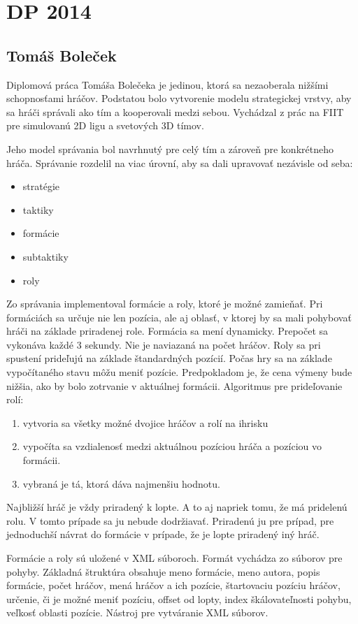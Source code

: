 \section{DP 2014}

\subsection{Tomáš Boleček}
Diplomová práca Tomáša Bolečeka \cite{bolecek} je jedinou, ktorá sa nezaoberala nižšími schopnosťami hráčov. Podstatou bolo vytvorenie modelu strategickej vrstvy, aby sa hráči správali ako tím a kooperovali medzi sebou. Vychádzal z prác na FIIT pre simulovanú 2D ligu a svetových 3D tímov. 

Jeho model správania bol navrhnutý pre celý tím a zároveň pre konkrétneho hráča. Správanie rozdelil na viac úrovní, aby sa dali upravovať nezávisle od seba:
\begin{itemize}
\item stratégie
\item taktiky
\item formácie
\item subtaktiky
\item roly
\end{itemize}
Zo správania implementoval formácie a roly, ktoré je možné zamieňať. Pri formáciách sa určuje nie len pozícia, ale aj oblasť, v ktorej by sa mali pohybovať hráči na základe priradenej role. Formácia sa mení dynamicky. Prepočet sa vykonáva každé 3 sekundy. Nie je naviazaná na počet hráčov. Roly sa pri spustení prideľujú na základe štandardných pozícií. Počas hry sa na základe vypočítaného stavu môžu meniť pozície. Predpokladom je, že cena výmeny bude nižšia, ako by bolo zotrvanie v aktuálnej formácii. Algoritmus pre prideľovanie rolí:
\begin{enumerate}
\item vytvoria sa všetky možné dvojice hráčov a rolí na ihrisku
\item vypočíta sa vzdialenosť medzi aktuálnou pozíciou hráča a pozíciou vo formácii.
\item vybraná je tá, ktorá dáva najmenšiu hodnotu.
\end{enumerate}
Najbližší hráč je vždy priradený k lopte. A to aj napriek tomu, že má pridelenú rolu. V tomto prípade sa ju nebude dodržiavať. Priradenú ju pre prípad, pre jednoduchší návrat do formácie v prípade, že je lopte priradený iný hráč.

Formácie a roly sú uložené v XML súboroch. Formát vychádza zo súborov pre pohyby. Základná štruktúra obsahuje meno formácie, meno autora, popis formácie, počet hráčov, mená hráčov a ich pozície, štartovaciu pozíciu hráčov, určenie, či je možné meniť pozíciu, offset od lopty, index škálovateľnosti pohybu, veľkosť oblasti pozície.
Nástroj pre vytváranie XML súborov.


